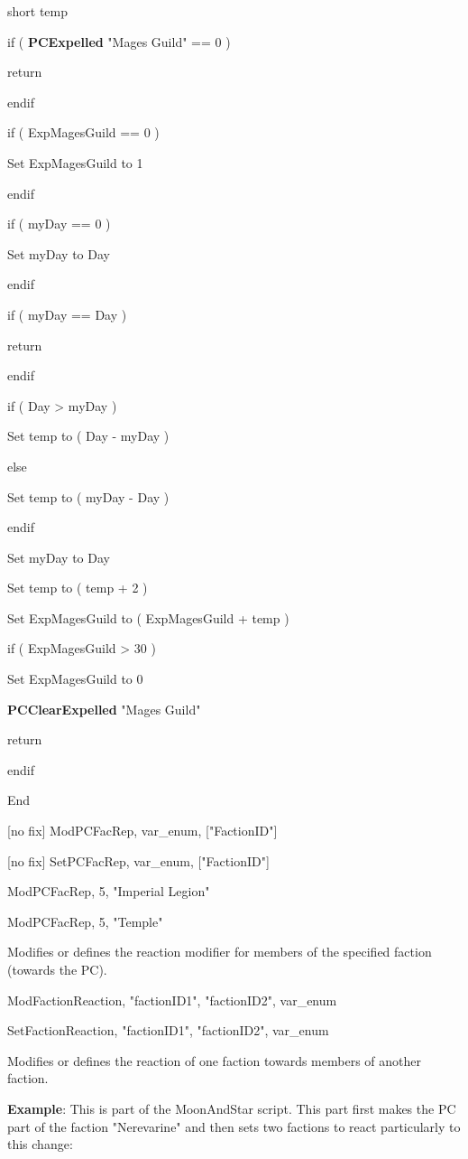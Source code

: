 \documentclass[
]{article}
\begin{document}
short temp

if ( \textbf{PCExpelled} "Mages Guild" == 0 )

return

endif

if ( ExpMagesGuild == 0 )

Set ExpMagesGuild to 1

endif

if ( myDay == 0 )

Set myDay to Day

endif

if ( myDay == Day )

return

endif

if ( Day \textgreater{} myDay )

Set temp to ( Day - myDay )

else

Set temp to ( myDay - Day )

endif

Set myDay to Day

Set temp to ( temp + 2 )

Set ExpMagesGuild to ( ExpMagesGuild + temp )

if ( ExpMagesGuild \textgreater{} 30 )

Set ExpMagesGuild to 0

\textbf{PCClearExpelled} "Mages Guild"

return

endif

End

{[}no fix{]} ModPCFacRep, var\_enum, {[}"FactionID"{]}

{[}no fix{]} SetPCFacRep, var\_enum, {[}"FactionID"{]}

ModPCFacRep, 5, "Imperial Legion"

ModPCFacRep, 5, "Temple"

Modifies or defines the reaction modifier for members of the specified
faction (towards the PC).

ModFactionReaction, "factionID1", "factionID2", var\_enum

SetFactionReaction, "factionID1", "factionID2", var\_enum

Modifies or defines the reaction of one faction towards members of
another faction.

\textbf{Example}: This is part of the MoonAndStar script. This part
first makes the PC part of the faction "Nerevarine" and then sets two
factions to react particularly to this change:
\end{document}
